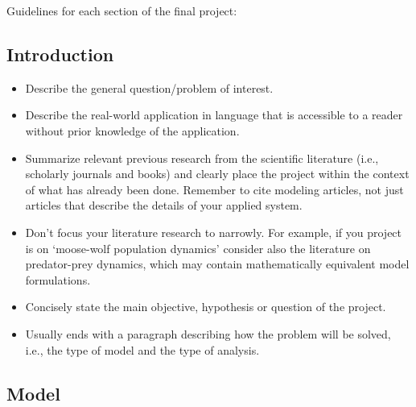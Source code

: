 \documentclass[]{book}
\providecommand{\tightlist}{%
  \setlength{\itemsep}{0pt}\setlength{\parskip}{0pt}}
\begin{document}
Guidelines for each section of the final project:

\subsection{Introduction}\label{introduction}

\begin{itemize}
\tightlist
\item
  Describe the general question/problem of interest.
\item
  Describe the real-world application in language that is accessible to
  a reader without prior knowledge of the application.
\item
  Summarize relevant previous research from the scientific literature
  (i.e., scholarly journals and books) and clearly place the project
  within the context of what has already been done. Remember to cite
  modeling articles, not just articles that describe the details of your
  applied system.
\item
  Don't focus your literature research to narrowly. For example, if you
  project is on `moose-wolf population dynamics' consider also the
  literature on predator-prey dynamics, which may contain mathematically
  equivalent model formulations.
\item
  Concisely state the main objective, hypothesis or question of the
  project.
\item
  Usually ends with a paragraph describing how the problem will be
  solved, i.e., the type of model and the type of analysis.
\end{itemize}

\subsection{Model}\label{model}
\end{document}
